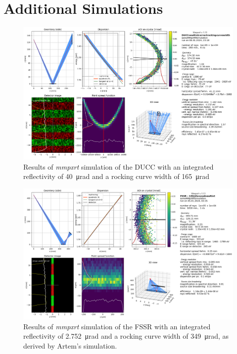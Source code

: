 \section{Additional Simulations}
\label{section: new simulations}

\begin{figure}[H]
	\centering
	\includegraphics[width=1.12\textwidth, angle=90]{Data_Analysis/mmpxrt_DUCC_new_values.png}
	\caption{Results of \textit{mmpxrt} simulation of the DUCC with an integrated reflectivity of \SI{40}{\micro\radian} and a rocking curve width of \SI{165}{\micro\radian}}
	\label{fig: DUCC new mmpxrt}
\end{figure}

\begin{figure}[H]
	\centering
	\includegraphics[width=1.15\textwidth, angle=90]{Data_Analysis/mmpxrt_FSSR_new_values.png}
	\caption{Results of \textit{mmpxrt} simulation of the FSSR with an integrated reflectivity of \SI{2.752}{\micro\radian} and a rocking curve width of \SI{349}{\micro\radian}, as derived by Artem's simulation.}
	\label{fig: FSSR new mmpxrt}
\end{figure}

